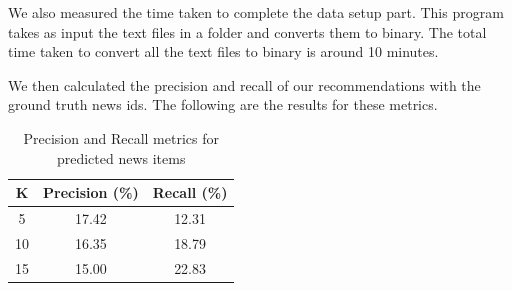 \documentclass[hidelinks,12pt]{article}
\begin{document}
We also measured the time taken to complete the data setup part. This program takes as input the
text files in a folder and converts them to binary. The total time taken to convert all the text files to binary is
around 10 minutes.

We then calculated the precision and recall of our recommendations with the ground truth news ids. The following are the results
for these metrics.

\begin{table}[H]
  \centering
  \begin{tabular}{|c|c|c|}
    \hline
    K  & Precision (\%) & Recall (\%) \\ \hline
    5  & 17.42          & 12.31       \\
    10 & 16.35          & 18.79       \\
    15 & 15.00          & 22.83       \\
    \hline
  \end{tabular}
  \caption{Precision and Recall metrics for predicted news items}
\end{table}
\end{document}
